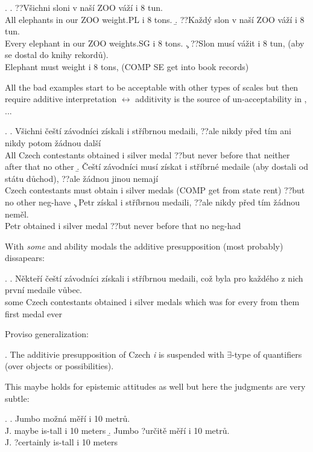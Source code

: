 \documentclass{article}
\begin{document}
\ex. \a. ??Všichni sloni v naší ZOO váží i 8 tun.\\
All elephants in our ZOO weight.PL i 8 tons.
\b. ??Každý slon v naší ZOO váží i 8 tun.\\
Every elephant in our ZOO weights.SG i 8 tons.
\c. ??Slon musí vážit i 8 tun, (aby se dostal do knihy rekordů).\\
Elephant must weight i 8 tons, (COMP SE get into book records)

All the bad examples start to be acceptable with other types of scales but then require additive interpretation $\leftrightarrow$ additivity is the source of un-acceptability in \Last, ...

\ex. \a. Všichni čeští závodníci získali i stříbrnou medaili, ??ale nikdy před tím ani nikdy potom žádnou další\\
All Czech contestants obtained i silver medal ??but never before that neither after that no other
\b. Čeští závodníci musí získat i stříbrné medaile (aby dostali od státu důchod), ??ale žádnou jinou nemají\\
Czech contestants must obtain i silver medals (COMP get from state rent) ??but no other neg-have
\c. Petr získal i stříbrnou medaili, ??ale nikdy před tím žádnou neměl.\\
Petr obtained i silver medal ??but never before that no neg-had

With \textit{some} and ability modals the additive presupposition (most probably) dissapears:

\ex. \a. Někteří čeští závodníci získali i stříbrnou medaili, což byla pro každého z nich první medaile vůbec.\\
some Czech contestants obtained i silver medals which was for every from them first medal ever

Proviso generalization:

\ex. The additivie presupposition of Czech \textit{i} is suspended with $\exists$-type of quantifiers (over objects or possibilities).

This maybe holds for epistemic attitudes as well but here the judgments are very subtle:

\ex. \a. Jumbo možná měří i 10 metrů.\\
J. maybe is-tall i 10 meters
\b. Jumbo ?určitě měří i 10 metrů.\\
J. ?certainly is-tall i 10 meters
\end{document}
